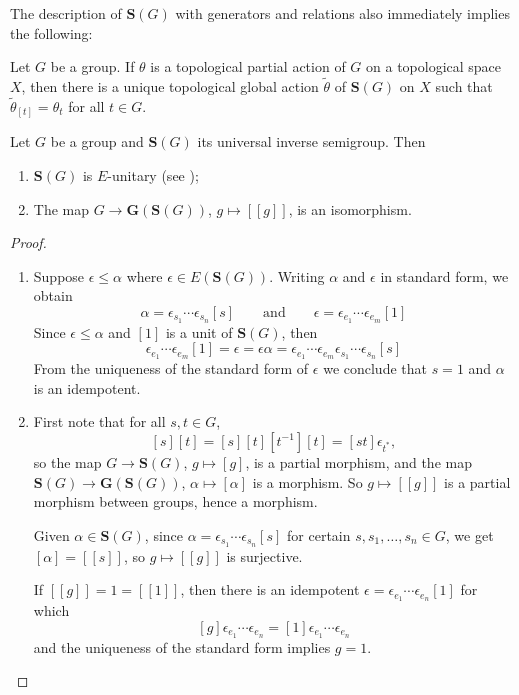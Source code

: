 The description of $\mathbf{S}(G)$ with generators and relations also immediately implies the following:

\begin{theorem}[{\cite[Theorem 4.2]{MR1469405}}]
Let $G$ be a group. If $\theta$ is a topological partial action of $G$ on a topological space $X$, then there is a unique topological global action $\widetilde{\theta}$ of $\mathbf{S}(G)$ on $X$ such that $\widetilde{\theta}_{[t]}=\theta_t$ for all $t\in G$.
\end{theorem}

\begin{proposition}\label{propositionGSGigualG}
Let $G$ be a group and $\mathbf{S}(G)$ its universal inverse semigroup. Then
\begin{enumerate}
\item[(a)] $\mathbf{S}(G)$ is $E$-unitary (see \cite[Remark~3.5]{MR1469405});
\item[(b)] The map $G\to \mathbf{G}(\mathbf{S}(G))$, $g\mapsto [[g]]$, is an isomorphism.
\end{enumerate}
\end{proposition}
\begin{proof}
\begin{enumerate}
\item[(a)] Suppose $\epsilon\leq\alpha$ where $\epsilon\in E(\mathbf{S}(G))$. Writing $\alpha$ and $\epsilon$ in standard form, we obtain
\[\alpha=\epsilon_{s_1}\cdots\epsilon_{s_n}[s]\qquad\text{and}\qquad\epsilon=\epsilon_{e_1}\cdots\epsilon_{e_m}[1]\]
Since $\epsilon\leq\alpha$ and $[1]$ is a unit of $\mathbf{S}(G)$, then
\[\epsilon_{e_1}\cdots\epsilon_{e_m}[1]=\epsilon=\epsilon\alpha=\epsilon_{e_1}\cdots\epsilon_{e_m}\epsilon_{s_1}\cdots\epsilon_{s_n}[s]\]
From the uniqueness of the standard form of $\epsilon$ we conclude that $s=1$ and $\alpha$ is an idempotent.
\item[(b)] First note that for all $s,t\in G$,
\[[s][t]=[s][t][t^{-1}][t]=[st]\epsilon_{t^*},\]
so the map $G\to\mathbf{S}(G)$, $g\mapsto [g]$, is a partial morphism, and the map $\mathbf{S}(G)\to \mathbf{G}(\mathbf{S}(G))$, $\alpha\mapsto[\alpha]$ is a morphism. So $g\mapsto[[g]]$ is a partial morphism between groups, hence a morphism.

Given $\alpha\in \mathbf{S}(G)$, since $\alpha=\epsilon_{s_1}\cdots\epsilon_{s_n}[s]$ for certain $s,s_1,\ldots,s_n\in G$, we get $[\alpha]=[[s]]$, so $g\mapsto [[g]]$ is surjective.

If $[[g]]=1=[[1]]$, then there is an idempotent $\epsilon=\epsilon_{e_1}\cdots\epsilon_{e_n}[1]$ for which
\[[g]\epsilon_{e_1}\cdots\epsilon_{e_n}=[1]\epsilon_{e_1}\cdots\epsilon_{e_n}\]
and the uniqueness of the standard form implies $g=1$.\qedhere
\end{enumerate}
\end{proof}

